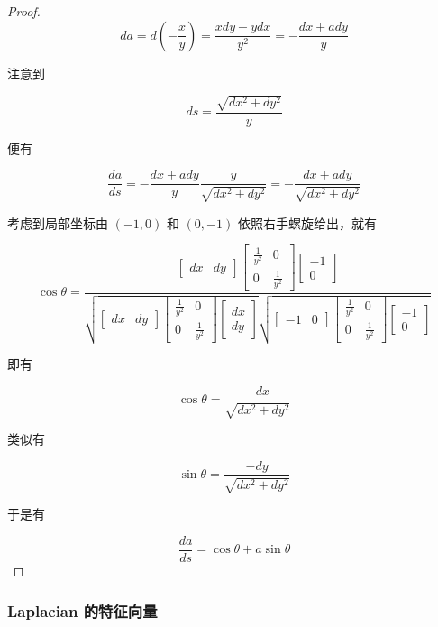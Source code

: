 \documentclass[a4paper,12pt]{article}
\numberwithin{definition}{section}
\numberwithin{lemma}{section}
\numberwithin{proposition}{section}
\numberwithin{theorem}{section}
\numberwithin{grammar}{section}
\numberwithin{program}{section}
\numberwithin{convention}{section}
\numberwithin{corollary}{section}
\begin{document}
\begin{proof}
$$
da = d(-\frac{x}{y}) = \frac{xdy - ydx}{y^2} = -\frac{dx + ady}{y}
$$

注意到

$$
ds = \frac{\sqrt{dx^2 + dy^2}}{y}
$$

便有

$$
\frac{da}{ds} = - \frac{dx + ady}{y} \frac{y}{\sqrt{dx^2 + dy^2}} = - \frac{dx + ady}{\sqrt{dx^2 + dy^2}}
$$

考虑到局部坐标由 $(-1, 0)$ 和 $(0, -1)$ 依照右手螺旋给出，就有

$$
\cos \theta = \frac{\begin{bmatrix} dx & dy \end{bmatrix} \begin{bmatrix} \frac{1}{y^2} & 0 \\ 0 & \frac{1}{y^2} \end{bmatrix} \begin{bmatrix} -1 \\ 0 \end{bmatrix}}{\sqrt{\begin{bmatrix} dx & dy \end{bmatrix} \begin{bmatrix} \frac{1}{y^2} & 0 \\ 0 & \frac{1}{y^2} \end{bmatrix} \begin{bmatrix} dx \\ dy \end{bmatrix}}\sqrt{\begin{bmatrix} -1 & 0 \end{bmatrix} \begin{bmatrix} \frac{1}{y^2} & 0 \\ 0 & \frac{1}{y^2} \end{bmatrix} \begin{bmatrix} -1 \\ 0 \end{bmatrix}}}
$$

即有

$$
\cos \theta = \frac{-dx}{\sqrt{dx^2 + dy^2}}
$$

类似有

$$
\sin \theta = \frac{-dy}{\sqrt{dx^2 + dy^2}}
$$

于是有

$$
\frac{da}{ds} = \cos \theta + a \sin \theta
$$

\end{proof}

\subsubsection{Laplacian 的特征向量}
\end{document}
